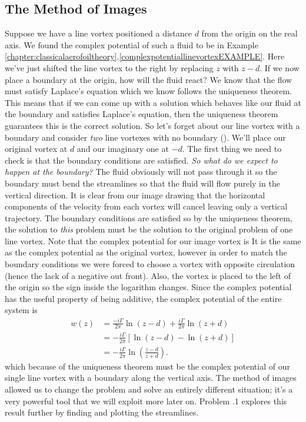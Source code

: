 \documentclass[12pt]{book}
\begin{document}
\subsection{The Method of Images}
Suppose we have a line vortex positioned a distance $d$ from the origin on the real axis. We found the complex potential of such a fluid to be 
in Example \ref{chapter:classicalaerofoiltheory}.\ref{complexpotentiallinevortexEXAMPLE}. Here we've just shifted the line vortex to the right by replacing $z$ with $z-d$.  If we now place a boundary at the origin, how will the fluid react?  We know that the flow must satisfy Laplace's equation
which we know follows the uniqueness theorem.  This means that if we can come up with a solution which behaves like our fluid at the boundary and satisfies Laplace's equation, then the uniqueness theorem guarantees this is the correct solution.  So let's forget about our line vortex with a boundary and consider \textit{two} line vortexes with no boundary ().  We'll place our original vortex at $d$ and our imaginary one at $-d$.  The first thing we need to check is that the boundary conditions are satisfied.  \textit{So what do we expect to happen at the boundary?}  The fluid obviously will not pass through it so the boundary must bend the streamlines so that the fluid will flow purely in the vertical direction.  It is clear from our image drawing that the horizontal components of the velocity from each vortex will cancel leaving only a vertical trajectory.  The boundary conditions are satisfied so by the uniqueness theorem, the solution to \textit{this} problem must be the solution to the original problem of one line vortex.  Note that  the complex potential for our image vortex is
 It is the same as the complex potential as the original vortex, however in order to match the boundary conditions we were forced to choose a vortex with opposite circulation (hence the lack of a negative out front). Also, the vortex is placed to the left of the origin so the sign inside the logarithm changes.  Since the complex potential has the useful property of being additive, the complex potential of the entire system is 
\begin{align*}w(z) &= \frac{-i\Gamma}{2\pi}\ln\left(z-d\right) + \frac{i\Gamma}{2\pi}\ln\left(z+d\right) \\
& = -\frac{i\Gamma}{2\pi}\left[\ln\left(z-d\right) - \ln\left(z+d\right)\right]\\
&= -\frac{i\Gamma}{2\pi}\ln\left(\frac{z-d}{z+d}\right).
\end{align*}
which because of the uniqueness theorem must be the complex potential of our single line vortex with a boundary along the vertical axis.  The method of images allowed us to change the problem and solve an entirely different situation; it's a very powerful tool that we will exploit more later on.  Problem \thechapter.1 explores this result further by finding and plotting the streamlines.
\end{document}
